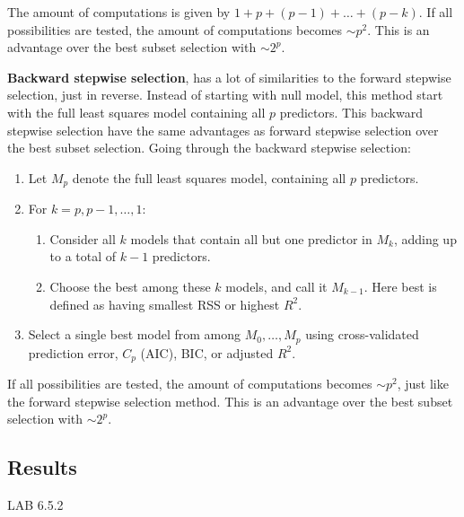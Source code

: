 The amount of computations is given by $1+p+(p-1)+\dots+(p-k)$. If all possibilities are tested, the amount of computations becomes $\sim p^2$. This is an advantage over the best subset selection with $\sim 2^p$.

\textbf{Backward stepwise selection}, has a lot of similarities to the forward stepwise selection, just in reverse. Instead of starting with null model, this method start with the full least squares model containing all $p$ predictors. This backward stepwise selection have the same advantages as forward stepwise selection over the best subset selection. Going through the backward stepwise selection:

\begin{enumerate}
	\item Let $M_p$ denote the full least squares model, containing all $p$ predictors.
	\item For $k=p,p-1,\dots,1$:
	\begin{enumerate}
		\item Consider all $k$ models that contain all but one predictor in $M_k$, adding up to a total of $k-1$ predictors.
		\item Choose the best among these $k$ models, and call it $M_{k-1}$. Here best is defined as having smallest RSS or highest $R^2$.
	\end{enumerate}
	\item Select a single best model from among $M_0,\dots,M_p$ using cross-validated prediction error, $C_p$ (AIC), BIC, or adjusted $R^2$. 
\end{enumerate}

If all possibilities are tested, the amount of computations becomes $\sim p^2$, just like the forward stepwise selection method. This is an advantage over the best subset selection with $\sim 2^p$.

\subsection{Results}
LAB 6.5.2